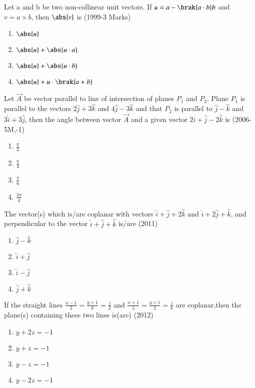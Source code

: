 \iffalse
\title{Assignment-3}
\author{EE24BTECH11048-NITHIN.K}
\section{mcq-multiple}
\fi
	\item Let a and b be two non-collinear unit vectors. If $u=a-\brak{a\cdot b}b$ and $v=a\times b$, then $\abs{v}$ is \hfill{(1999-3 Marks)}
		\begin{enumerate}
			\item $\abs{u}$
			\item $\abs{u} + \abs{u \cdot a}$
			\item $\abs{u} + \abs{u \cdot b}$
			\item $\abs{u} +  u\cdot\brak{a+b}$
		\end{enumerate}
	\item Let $\vec{A}$ be vector parallel to line of intersection of planes $P_1$ and $P_2$. Plane $P_1$ is parallel to the vectors $2\hat{j}+3\hat{k}$ and $4\hat{j}-3\hat{k}$ and that $P_2$ is
		parallel to $\hat{j}-\hat{k}$ and $3\hat{i}+3\hat{j}$, then the angle between vector $\vec{A}$ and a given vector $2\hat{i}+\hat{j}-2\hat{k}$ is \hfill{(2006-5M,-1)}
		\begin{enumerate}
			\item $\frac{\pi}{2}$
			\item $\frac{\pi}{4}$
			\item $\frac{\pi}{6}$
			\item $\frac{3\pi}{4}$
		\end{enumerate}
	\item The vector(s) which is/are coplanar with vectors $\hat{i}+\hat{j}+2\hat{k}$ and $\hat{i}+2\hat{j}+\hat{k}$, and perpendicular to the vector $\hat{i}+\hat{j}+\hat{k}$ is/are \hfill{(2011)}
		\begin{enumerate}
			\item $\hat{j}-\hat{k}$
			\item $\hat{i}+\hat{j}$
			\item $\hat{i}-\hat{j}$
			\item $\hat{j}+\hat{k}$
		\end{enumerate}
	\item If the straight lines $\frac{x-1}{2}=\frac{y+1}{k}=\frac{z}{2}$ and $\frac{x+1}{5}=\frac{y+1}{2}=\frac{z}{k}$ are coplanar,then the plane(s) containing these two lines is(are) \hfill{(2012)}
		\begin{enumerate}
			\item $y+2z=-1$
			\item $y+z=-1$
			\item $y-z=-1$
			\item $y-2z=-1$
		\end{enumerate}
